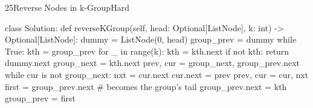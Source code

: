 \begin{problem}{25}{Reverse Nodes in k-Group}{Hard}
\begin{code}
class Solution:
    def reverseKGroup(self, head: Optional[ListNode], k: int) -> Optional[ListNode]:
        dummy = ListNode(0, head)
        group_prev = dummy
        while True:
            kth = group_prev
            for _ in range(k):
                kth = kth.next
                if not kth:
                    return dummy.next
            group_next = kth.next
            prev, cur = group_next, group_prev.next
            while cur is not group_next:
                nxt = cur.next
                cur.next = prev
                prev, cur = cur, nxt
            first = group_prev.next          # becomes the group's tail
            group_prev.next = kth
            group_prev = first
\end{code}
\end{problem}
